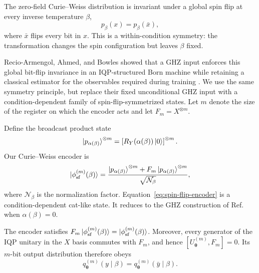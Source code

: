 \documentclass[pra,aps,10pt,twocolumn,floatfix,superscriptaddress,
notitlepage,longbibliography]{revtex4-2}
\begin{document}
The zero-field Curie--Weiss distribution is invariant under a global spin flip at every inverse temperature $\beta$,
\begin{equation}
    p_\beta(x)=p_\beta(\bar{x}),
    \label{eq:curie-spin-flip-target}
\end{equation}
where $\bar{x}$ flips every bit in $x$. This is a within-condition symmetry: the transformation changes the spin configuration but leaves $\beta$ fixed.

Recio-Armengol, Ahmed, and Bowles showed that a GHZ input enforces this global bit-flip invariance in an IQP-structured Born machine while retaining a classical estimator for the observables required during training \cite{recio-armengolTrainClassicalDeploy2026}. We use the same symmetry principle, but replace their fixed unconditional GHZ input with a condition-dependent family of spin-flip-symmetrized states. Let $m$ denote the size of the register on which the encoder acts and let $F_m=X^{\otimes m}$.

Define the broadcast product state
\begin{equation}
    \ket{p_{\alpha(\beta)}}^{\otimes m}
    =\left[R_Y\!\left(\alpha(\beta)\right)\ket{0}\right]^{\otimes m}.
    \label{eq:curie-base-product-state}
\end{equation}
Our Curie--Weiss encoder is
\begin{equation}
    \ket{\phi_{\mathrm{sf}}^{(m)}(\beta)}
    =\frac{\ket{p_{\alpha(\beta)}}^{\otimes m}+F_m\ket{p_{\alpha(\beta)}}^{\otimes m}}{\sqrt{\mathcal N_\beta}},
    \label{eq:spin-flip-encoder}
\end{equation}
where $\mathcal N_\beta$ is the normalization factor. Equation~\eqref{eq:spin-flip-encoder} is a condition-dependent cat-like state. It reduces to the GHZ construction of Ref.~\cite{recio-armengolTrainClassicalDeploy2026} when $\alpha(\beta)=0$.

The encoder satisfies $F_m\ket{\phi_{\mathrm{sf}}^{(m)}(\beta)}=\ket{\phi_{\mathrm{sf}}^{(m)}(\beta)}$. Moreover, every generator of the IQP unitary in the $X$ basis commutes with $F_m$, and hence $[U_{\boldsymbol{\theta}}^{(m)},F_m]=0$. Its $m$-bit output distribution therefore obeys
\begin{equation}
    q_{\boldsymbol{\theta}}^{(m)}(y\mid\beta)
    =q_{\boldsymbol{\theta}}^{(m)}(\bar{y}\mid\beta).
    \label{eq:register-spin-flip-invariance}
\end{equation}
\end{document}
